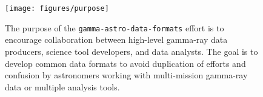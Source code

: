 \begin{figure}[tb]
\centerline{\texttt{[image: figures/purpose]}}
\caption{
The purpose of the \texttt{gamma-astro-data-formats} effort is to encourage collaboration between high-level gamma-ray data producers, science tool developers, and data analysts. The goal is to develop common data formats to avoid duplication of efforts and confusion by astronomers working with multi-mission gamma-ray data or multiple analysis tools.
}
\label{fig:purpose}
\end{figure}
